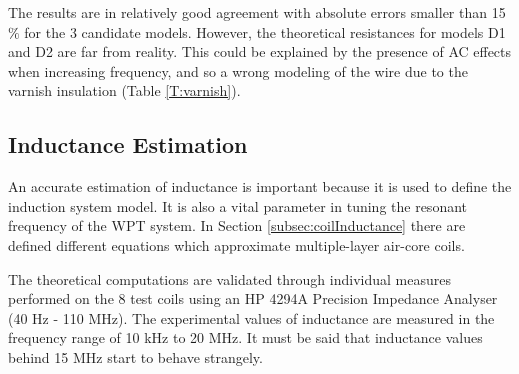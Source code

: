 The results are in relatively good agreement with absolute errors smaller than 15$\%$ for the 3 candidate models. However, the theoretical resistances for models D1 and D2 are far from reality. This could be explained by the presence of AC effects when increasing frequency, and so a wrong modeling of the wire due to the varnish insulation (Table \ref{T:varnish}).




	\subsection{Inductance Estimation}
An accurate estimation of inductance is important because it is used to define the induction system model. It is also a vital parameter in tuning the resonant frequency of the WPT system. In Section \ref{subsec:coilInductance} there are defined different equations which approximate multiple-layer air-core coils.

The theoretical computations are validated through individual measures performed on the 8 test coils using an HP 4294A Precision Impedance Analyser (40 Hz - 110 MHz). The experimental values of inductance are measured in the frequency range of 10 kHz to 20 MHz. It must be said that inductance values behind 15 MHz start to behave strangely. 



